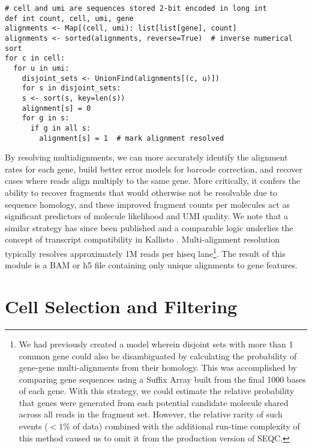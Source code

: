 \begin{verbatim}
# cell and umi are sequences stored 2-bit encoded in long int
def int count, cell, umi, gene
alignments <- Map[(cell, umi): list[list[gene], count]
alignments <- sorted(alignments, reverse=True)  # inverse numerical sort
for c in cell:
  for u in umi:
    disjoint_sets <- UnionFind(alignments[(c, u)])
    for s in disjoint_sets:
    s <- sort(s, key=len(s))
    alignment[s] = 0
    for g in s:
      if g in all s:
        alignment[s] = 1  # mark alignment resolved
\end{verbatim}

By resolving multialignments, we can more accurately identify the alignment rates for each gene, build better error models for barcode correction, and recover cases where reads align multiply to the same gene. 
More critically, it confers the ability to recover fragments that would otherwise not be resolvable due to sequence homology, and these improved fragment counts per molecules act as significant predictors of molecule likelihood and UMI quality. 
We note that a similar strategy has since been published \citep{Klein2015} and a comparable logic underlies the concept of transcript compatibility in Kallisto \citep{Bray2016}.
Multi-alignment resolution typically resolves approximately 1M reads per hiseq lane\footnote{We had previously created a model wherein disjoint sets with more than 1 common gene could also be disambiguated by calculating the probability of gene-gene multi-alignments from their homology. This was accomplished by comparing gene sequences using a Suffix Array built from the final 1000 bases of each gene. With this strategy, we could estimate the relative probability that genes were generated from each potential candidate molecule shared across all reads in the fragment set. However, the relative rarity of such events ($<1\%$ of data) combined with the additional run-time complexity of this method caused us to omit it from the production version of SEQC\@.}. 
The result of this module is a BAM or h5 file containing only unique alignments to gene features.
 
\section{Cell Selection and Filtering}


